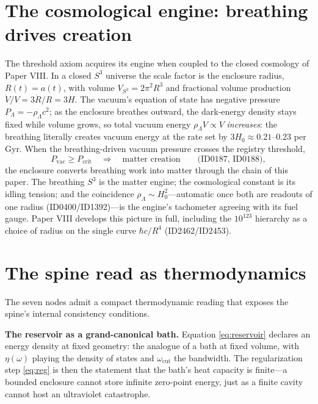 \documentclass[11pt]{article}
\theoremstyle{remark}
\begin{document}
\section{The cosmological engine: breathing drives creation}
\label{sec:cosmo}

The threshold axiom acquires its engine when coupled to the closed cosmology of Paper VIII. In a closed $S^3$ universe the scale factor is the enclosure radius, $R(t) = a(t)$, with volume $V_{S^3} = 2\pi^2 R^3$ and fractional volume production $\dot{V}/V = 3\dot{R}/R = 3H$. The vacuum's equation of state has negative pressure $P_\Lambda = -\rho_\Lambda c^2$; as the enclosure breathes outward, the dark-energy density stays fixed while volume grows, so total vacuum energy $\rho_\Lambda V \propto V$ \emph{increases}: the breathing literally creates vacuum energy at the rate set by $3H_0 \approx 0.21$--$0.23$ per Gyr. When the breathing-driven vacuum pressure crosses the registry threshold,
\begin{equation}
P_{\mathrm{vac}} \geq P_{\mathrm{crit}} \quad \Longrightarrow \quad \text{matter creation} \qquad \text{(ID0187, ID0188)},
\end{equation}
the enclosure converts breathing work into matter through the chain of this paper. The breathing $S^3$ is the matter engine; the cosmological constant is its idling tension; and the coincidence $\rho_\Lambda \sim H_0^2$---automatic once both are readouts of one radius (ID0400/ID1392)---is the engine's tachometer agreeing with its fuel gauge. Paper VIII develops this picture in full, including the $10^{123}$ hierarchy as a choice of radius on the single curve $\hbar c/R^4$ (ID2462/ID2453).

\section{The spine read as thermodynamics}
\label{sec:thermo}

The seven nodes admit a compact thermodynamic reading that exposes the spine's internal consistency conditions.

\textbf{The reservoir as a grand-canonical bath.} Equation \eqref{eq:reservoir} declares an energy density at fixed geometry: the analogue of a bath at fixed volume, with $\eta(\omega)$ playing the density of states and $\omega_{\mathrm{cut}}$ the bandwidth. The regularization step \eqref{eq:reg} is then the statement that the bath's heat capacity is finite---a bounded enclosure cannot store infinite zero-point energy, just as a finite cavity cannot host an ultraviolet catastrophe.
\end{document}
